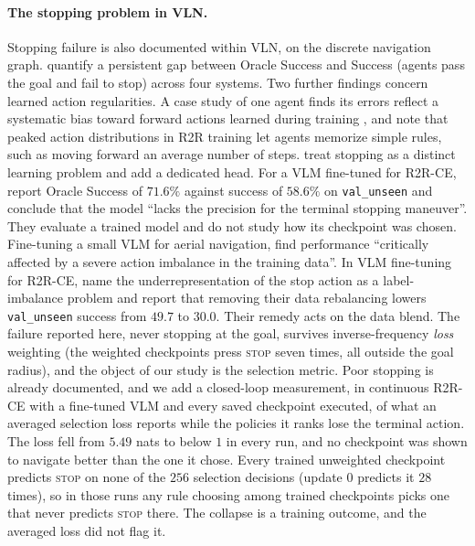 \paragraph{The stopping problem in VLN.}
Stopping failure is also documented within VLN, on the discrete navigation graph.
\citet{zhao2023mindthegap} quantify a persistent gap between Oracle Success and Success (agents
pass the goal and fail to stop) across four systems. Two further findings concern learned action
regularities. A case study of one agent finds its errors reflect a systematic bias toward forward
actions learned during training \citep{yang2023behavioral}, and \citet{thomason2019shifting} note
that peaked action distributions in R2R training let agents memorize simple rules, such as moving
forward an average number of steps. \citet{xiang2020l2stop} treat stopping as a distinct learning
problem and add a dedicated head. For a VLM fine-tuned for R2R-CE, \citet{dang2026rynnbrain} report
Oracle Success of $71.6\%$ against success of $58.6\%$ on \texttt{val\_unseen} and conclude that the
model ``lacks the precision for the terminal stopping maneuver''. They evaluate a trained model and
do not study how its checkpoint was chosen. Fine-tuning a small VLM for aerial navigation,
\citet{tamazyan2025aerial} find performance ``critically affected by a severe action imbalance in
the training data''. In VLM fine-tuning for R2R-CE, \citet{cheng2025navila} name the
underrepresentation of the stop action as a label-imbalance problem and report that removing their
data rebalancing lowers \texttt{val\_unseen} success from $49.7$ to $30.0$. Their remedy acts on the
data blend. The failure reported here, never stopping at the goal, survives inverse-frequency
\emph{loss} weighting (the weighted checkpoints press \textsc{stop} seven times, all outside the goal
radius), and the object of our study is the selection metric. Poor stopping is already documented, and we add a closed-loop
measurement, in continuous R2R-CE with a fine-tuned VLM and every saved
checkpoint executed, of what an averaged selection loss reports while the policies it ranks lose the
terminal action. The loss fell from $5.49$ nats to below $1$ in every run, and no checkpoint was
shown to navigate better than the one it chose. Every trained unweighted checkpoint predicts
\textsc{stop} on none of the $256$ selection decisions (update $0$ predicts it $28$ times), so in
those runs any rule choosing among trained checkpoints picks one that never predicts \textsc{stop}
there. The collapse is a training outcome, and the averaged loss did not flag it.

